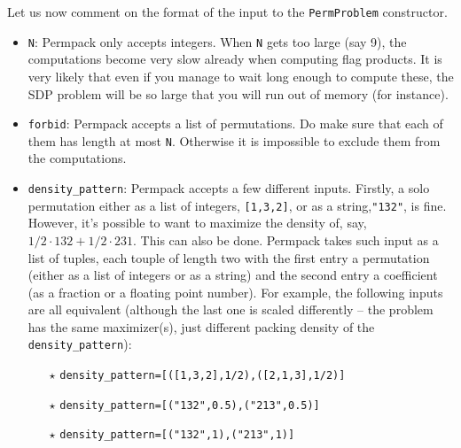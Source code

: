 \documentclass[12pt, a4paper, twoside]{report}
\begin{document}
Let us now comment on the format of the input to the \texttt{PermProblem} constructor. 
\begin{itemize}
\item \texttt{N}: Permpack only accepts integers. When \texttt{N} gets too large (say 9), the computations become very slow already when computing flag products. It is very likely that even if you manage to wait long enough to compute these, the SDP problem will be so large that you will run out of memory (for instance).
\item \texttt{forbid}: Permpack accepts a list of permutations. Do make sure that each of them has length at most \texttt{N}. Otherwise it is impossible to exclude them from the computations.
\item \texttt{density\_pattern}: Permpack accepts a few different inputs. Firstly, a solo permutation either as a list of integers, \texttt{[1,3,2]}, or as a string,\texttt{"132"}, is fine. However, it's possible to want to maximize the density of, say, $1/2\cdot 132 + 1/2\cdot 231$. This can also be done. Permpack takes such input as a list of tuples, each touple of length two with the first entry a permutation (either as a list of integers or as a string) and the second entry a coefficient (as a fraction or a floating point number). For example, the following inputs are all equivalent (although the last one is scaled differently -- the problem has the same maximizer(s), just different packing density of the \texttt{density\_pattern}):
\begin{itemize}
\item[$\star$] \texttt{density\_pattern=[([1,3,2],1/2),([2,1,3],1/2)]}
\item[$\star$] \texttt{density\_pattern=[("132",0.5),("213",0.5)]}
\item[$\star$] \texttt{density\_pattern=[("132",1),("213",1)]}
\end{itemize}
\end{itemize}
\end{document}
